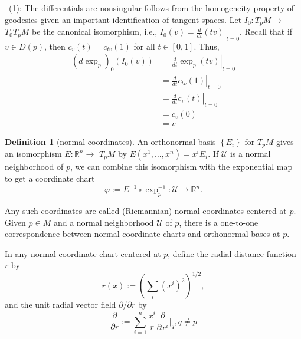 \documentclass[12pt,a4paper]{book}
\newenvironment{prooff}{{\noindent\it\textcolor{cyan!40!black}{Proof}:}\,}{\par}
\theoremstyle{definition}
\newtheorem{defn}{Definition}[section]
\begin{document}
\begin{prooff}
    (1): The differentials are nonsingular follows from the homogeneity property of geodesics given an important identification of tangent spaces.
    Let $I_0: T_p M \rightarrow$ $T_0 T_p M$ be the canonical isomorphism,
    i.e., $I_0(v)=\left.\frac{d}{d t}(t v)\right|_{t=0}$.
    Recall that if $v \in D(p)$, then $c_v(t)=c_{t v}(1)$ for all $t \in[0,1]$. Thus,
    $$
        \begin{aligned}
            (d\exp _p)_0\left(I_0(v)\right) & =\left.\frac{d}{d t} \exp _p(t v)\right|_{t=0} \\
                                            & =\left.\frac{d}{d t} c_{t v}(1)\right|_{t=0}   \\
                                            & =\left.\frac{d}{d t} c_v(t)\right|_{t=0}       \\
                                            & =\dot{c}_v(0)                                  \\
                                            & =v
        \end{aligned}
    $$
\end{prooff}
\begin{defn}[normal coordinates]
    An orthonormal basis $\left\{E_i\right\}$ for $T_p M$ gives an isomorphism $E: \mathbb{R}^n \rightarrow$ $T_p M$ by $E\left(x^1, \ldots, x^n\right)=x^i E_i$. If $\mathcal{U}$ is a normal neighborhood of $p$, we can combine this isomorphism with the exponential map to get a coordinate chart
    $$
        \varphi:=E^{-1} \circ \exp _p^{-1}: \mathcal{U} \rightarrow \mathbb{R}^n .
    $$

    Any such coordinates are called (Riemannian) normal coordinates centered at $p$. Given $p \in M$ and a normal neighborhood $\mathcal{U}$ of $p$, there is a one-to-one correspondence between normal coordinate charts and orthonormal bases at $p$.

    In any normal coordinate chart centered at $p$, define the radial distance function $r$ by
    $$
        r(x):=\left(\sum_i\left(x^i\right)^2\right)^{1 / 2},
    $$
    and the unit radial vector field $\partial / \partial r$ by
    $$
        \frac{\partial}{\partial r}:=\sum_{i=1}^n\frac{x^i}{r} \frac{\partial}{\partial x^i}\bigg|_q, q \neq p
    $$
\end{defn}
\end{document}
